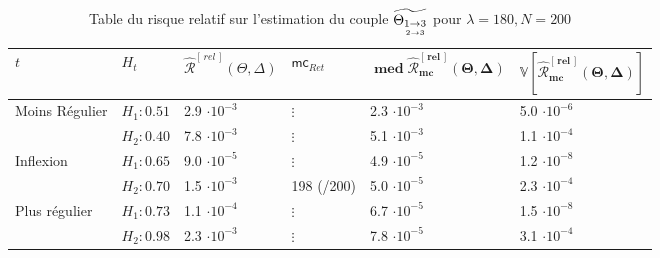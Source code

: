 \begin{table}[H]
	\centering
	\begin{tabularx}{\linewidth}{|X|X|XX|X|X|}
		\toprule
$t$                                  & $H_t$        & $\widehat{\mathcal R}^{[\,rel\,]}(\Theta, \Delta)$ & $\textsf{mc}_{Ret}$ & $\mathbf{\operatorname{med}\widehat{\mathcal R}^{[\,rel\,]}_{mc}(\Theta, \Delta)}$ & $\mathbf{\mathds V[\widehat{\mathcal R}^{[\,rel\,]}_{mc}(\Theta, \Delta)]}$ \\
		\midrule
		\multirow{2}{\hsize}{Moins Régulier} & $H_1 : 0.51$ & 2.9 $\cdot 10^{-3}$                    & $\vdots$            & 2.3 $\cdot 10^{-3}$                                                    & 5.0 $\cdot 10^{-6}$
		\\
		                                     & $H_2 : 0.40$ & 7.8 $\cdot 10^{-3}$                    & $\vdots$            & 5.1 $\cdot 10^{-3}$                                                    & 1.1 $\cdot 10^{-4}$
		\\
		\midrule
		\multirow{2}{\hsize}{Inflexion}      & $H_1 : 0.65$ & 9.0 $\cdot 10^{-5}$                    & $\vdots$            & 4.9 $\cdot 10^{-5}$                                                    & 1.2 $\cdot 10^{-8}$
		\\
		                                     & $H_2 : 0.70$ & 1.5 $\cdot 10^{-3}$                    & 198 (/200)          & 5.0 $\cdot 10^{-5}$                                                    & 2.3 $\cdot 10^{-4}$
		\\
		\midrule
		\multirow{2}{\hsize}{Plus régulier}  & $H_1 : 0.73$ & 1.1 $\cdot 10^{-4}$                    & $\vdots$            & 6.7 $\cdot 10^{-5}$                                                    & 1.5 $\cdot 10^{-8}$
		\\
		                                     & $H_2 : 0.98$ & 2.3 $\cdot 10^{-3}$                    & $\vdots$            & 7.8 $\cdot 10^{-5}$                                                    & 3.1 $\cdot 10^{-4}$
		\\
		\bottomrule
	\end{tabularx}
	\label{tab:qualite_estim_increments_relatif_new_sim}
	\caption{Table du risque relatif sur l'estimation du couple $\widetilde{\Theta_{\underset{2 \rightarrow 3}{1 \rightarrow 3}}}$ pour $\lambda=180, N=200$}
\end{table}

\noindent{}

